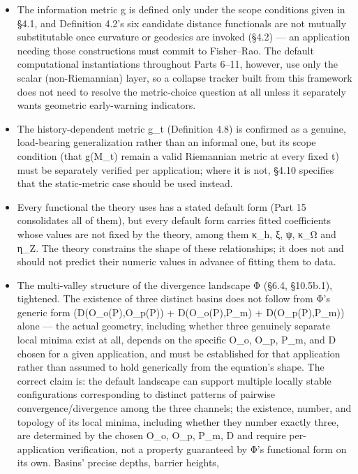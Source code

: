 \documentclass[
]{article}
\begin{document}
\begin{itemize}
\item
  The information metric g is defined only under the scope conditions
  given in §4.1, and Definition 4.2's six candidate distance functionals
  are not mutually substitutable once curvature or geodesics are invoked
  (§4.2) --- an application needing those constructions must commit to
  Fisher--Rao. The default computational instantiations throughout Parts
  6--11, however, use only the scalar (non-Riemannian) layer, so a
  collapse tracker built from this framework does not need to resolve
  the metric-choice question at all unless it separately wants geometric
  early-warning indicators.
\item
  The history-dependent metric g\_t (Definition 4.8) is confirmed as a
  genuine, load-bearing generalization rather than an informal one, but
  its scope condition (that g(M\_t) remain a valid Riemannian metric at
  every fixed t) must be separately verified per application; where it
  is not, §4.10 specifies that the static-metric case should be used
  instead.
\item
  Every functional the theory uses has a stated default form (Part 15
  consolidates all of them), but every default form carries fitted
  coefficients whose values are not fixed by the theory, among them
  κ\_h, ξ, ψ, κ\_Ω and η\_Z. The theory constrains the shape of these
  relationships; it does not and should not predict their numeric values
  in advance of fitting them to data.
\item
  The multi-valley structure of the divergence landscape Φ (§6.4,
  §10.5b.1), tightened. The existence of three distinct basins does not
  follow from Φ's generic form (D(O\_o(P),O\_p(P)) + D(O\_o(P),P\_m) +
  D(O\_p(P),P\_m)) alone --- the actual geometry, including whether
  three genuinely separate local minima exist at all, depends on the
  specific O\_o, O\_p, P\_m, and D chosen for a given application, and
  must be established for that application rather than assumed to hold
  generically from the equation's shape. The correct claim is: the
  default landscape can support multiple locally stable configurations
  corresponding to distinct patterns of pairwise convergence/divergence
  among the three channels; the existence, number, and topology of its
  local minima, including whether they number exactly three, are
  determined by the chosen O\_o, O\_p, P\_m, D and require
  per-application verification, not a property guaranteed by Φ's
  functional form on its own. Basins' precise depths, barrier heights,

\end{itemize}
\end{document}
